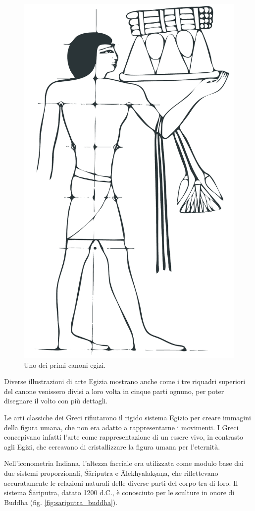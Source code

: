 \begin{figure}[h!]
\centering
\includegraphics[width=.35\textwidth]{./images/egizi_canone_piede.pdf}
\caption{Uno dei primi canoni egizi.}
\label{fig:egyptian_canon}
\end{figure}

Diverse illustrazioni di arte Egizia mostrano anche come i tre riquadri superiori del canone venissero divisi a loro volta in cinque parti ognuno, per poter disegnare il volto con più dettagli.

Le arti classiche dei Greci rifiutarono il rigido sistema Egizio per creare immagini della figura umana, che non era adatto a rappresentarne i movimenti. I Greci concepivano infatti l'arte come rappresentazione di un essere vivo, in contrasto agli Egizi, che cercavano di cristallizzare la figura umana per l'eternità.

Nell'iconometria Indiana, l'altezza facciale era utilizzata come modulo base dai due sistemi proporzionali, Śāriputra e Ālekhyalakṣaṇa, che riflettevano accuratamente le relazioni naturali delle diverse parti del corpo tra di loro. Il sistema Śāriputra, datato 1200 d.C., è conosciuto per le sculture in onore di Buddha (fig. \vref{fig:sariputra_buddha}).

